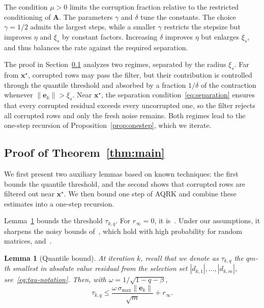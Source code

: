 \documentclass[pdflatex,sn-mathphys-num]{sn-jnl}
\theoremstyle{thmstyleone}
\newtheorem{lemma}{Lemma}
\theoremstyle{thmstylethree}
\newcommand{\mA}{\mathbf{A}}
\newcommand{\vx}{\mathbf{x}}
\newcommand{\ve}{\mathbf{e}}
\begin{document}
The condition $\mu>0$ limits the
corruption fraction relative to the restricted conditioning of $\mA$. The parameters $\gamma$ and
$\delta$ tune the constants. The choice $\gamma=1/2$ admits the largest
steps, while a smaller $\gamma$ restricts the stepsize but improves $\eta$
and $\xi_s$ by constant factors. Increasing $\delta$ improves $\eta$ but
enlarges $\xi_s$, and thus balances the rate against the required
separation.

The proof in Section~\ref{subsec:proofs} analyzes two regimes,
separated by the radius $\xi_s$. Far from $\vx^\star$, corrupted rows may
pass the filter, but their contribution is controlled through the quantile
threshold and absorbed by a fraction $1/\delta$ of the contraction whenever
$\|\ve_k\|>\xi_s$. Near $\vx^\star$, the separation
condition~\eqref{eq:separation} ensures that every corrupted residual exceeds
every uncorrupted one, so the filter rejects all corrupted rows and only the
fresh noise remains. Both regimes lead to the one-step recursion of
Proposition~\ref{prop:onestep}, which we iterate.

\subsection{Proof of Theorem~\ref{thm:main}}
\label{subsec:proofs}
We first present two auxiliary lemmas based on known techniques: the first
bounds the quantile threshold, and the second shows that corrupted rows are
filtered out near $\vx^\star$. We then bound one step of AQRK and combine
these estimates into a one-step recursion. 

Lemma~\ref{lem:quantile} bounds the threshold $\tau_{k,q}$. For
$r_\infty=0$, it is~\cite[Lemma~1]{steinerberger2021quantile}. Under our
assumptions, it sharpens the noisy bounds
of~\cite[Corollary~II.4]{jarman2021quantilerk}, which hold with high
probability for random matrices, and~\cite[Lemma~2.2]{coria2024quantile}.
\begin{lemma}[Quantile bound]
 \label{lem:quantile}
At iteration $k$, recall that we denote as $\tau_{k,q}$ the $qm$-th smallest in absolute value residual from the selection set $|d_{k,1}|,\ldots,|d_{k,m}|$, see~\eqref{eq:tau-notation}.
Then, with $\omega=1/\sqrt{1-q-\beta}$,
\[
\tau_{k,q}\le\frac{\omega\,\sigma_{\max}\|\ve_k\|}{\sqrt m}+r_\infty .
\]
\end{lemma}
\end{document}
